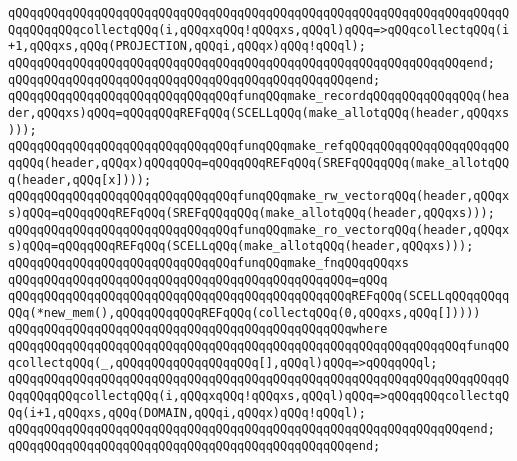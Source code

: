 \verb|qQQqqQQqqQQqqQQqqQQqqQQqqQQqqQQqqQQqqQQqqQQqqQQqqQQqqQQqqQQqqQQqqQQqqQQqqQQqqQQqcollectqQQq(i,qQQqxqQQq!qQQqxs,qQQql)qQQq=>qQQqcollectqQQq(i+1,qQQqxs,qQQq(PROJECTION,qQQqi,qQQqx)qQQq!qQQql);|\newline
\verb|qQQqqQQqqQQqqQQqqQQqqQQqqQQqqQQqqQQqqQQqqQQqqQQqqQQqqQQqqQQqqQQqend;|\newline
\verb|qQQqqQQqqQQqqQQqqQQqqQQqqQQqqQQqqQQqqQQqqQQqqQQqend;|\newline
\newline
\verb|qQQqqQQqqQQqqQQqqQQqqQQqqQQqqQQqfunqQQqmake_recordqQQqqQQqqQQqqQQq(header,qQQqxs)qQQq=qQQqqQQqREFqQQq(SCELLqQQq(make_allotqQQq(header,qQQqxs)));|\newline
\verb|qQQqqQQqqQQqqQQqqQQqqQQqqQQqqQQqfunqQQqmake_refqQQqqQQqqQQqqQQqqQQqqQQqqQQq(header,qQQqx)qQQqqQQq=qQQqqQQqREFqQQq(SREFqQQqqQQq(make_allotqQQq(header,qQQq[x])));|\newline
\verb|qQQqqQQqqQQqqQQqqQQqqQQqqQQqqQQqfunqQQqmake_rw_vectorqQQq(header,qQQqxs)qQQq=qQQqqQQqREFqQQq(SREFqQQqqQQq(make_allotqQQq(header,qQQqxs)));|\newline
\verb|qQQqqQQqqQQqqQQqqQQqqQQqqQQqqQQqfunqQQqmake_ro_vectorqQQq(header,qQQqxs)qQQq=qQQqqQQqREFqQQq(SCELLqQQq(make_allotqQQq(header,qQQqxs)));|\newline
\newline
\verb|qQQqqQQqqQQqqQQqqQQqqQQqqQQqqQQqfunqQQqmake_fnqQQqqQQqxs|\newline
\verb|qQQqqQQqqQQqqQQqqQQqqQQqqQQqqQQqqQQqqQQqqQQqqQQq=qQQq|\newline
\verb|qQQqqQQqqQQqqQQqqQQqqQQqqQQqqQQqqQQqqQQqqQQqqQQqREFqQQq(SCELLqQQqqQQqqQQq(*new_mem(),qQQqqQQqqQQqREFqQQq(collectqQQq(0,qQQqxs,qQQq[]))))|\newline
\verb|qQQqqQQqqQQqqQQqqQQqqQQqqQQqqQQqqQQqqQQqqQQqqQQqwhere|\newline
\verb|qQQqqQQqqQQqqQQqqQQqqQQqqQQqqQQqqQQqqQQqqQQqqQQqqQQqqQQqqQQqqQQqfunqQQqcollectqQQq(_,qQQqqQQqqQQqqQQqqQQq[],qQQql)qQQq=>qQQqqQQql;|\newline
\verb|qQQqqQQqqQQqqQQqqQQqqQQqqQQqqQQqqQQqqQQqqQQqqQQqqQQqqQQqqQQqqQQqqQQqqQQqqQQqqQQqcollectqQQq(i,qQQqxqQQq!qQQqxs,qQQql)qQQq=>qQQqqQQqcollectqQQq(i+1,qQQqxs,qQQq(DOMAIN,qQQqi,qQQqx)qQQq!qQQql);|\newline
\verb|qQQqqQQqqQQqqQQqqQQqqQQqqQQqqQQqqQQqqQQqqQQqqQQqqQQqqQQqqQQqqQQqend;|\newline
\verb|qQQqqQQqqQQqqQQqqQQqqQQqqQQqqQQqqQQqqQQqqQQqqQQqend;|\newline
\newline
